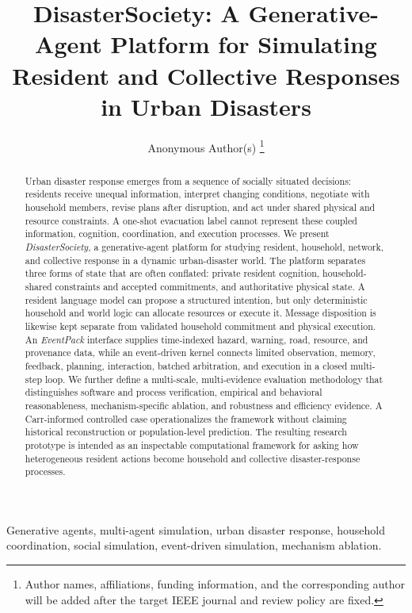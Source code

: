 \documentclass[journal]{IEEEtran}
\title{DisasterSociety: A Generative-Agent Platform for Simulating Resident and Collective Responses in Urban Disasters}
\author{Anonymous Author(s)%
\thanks{Author names, affiliations, funding information, and the corresponding
author will be added after the target IEEE journal and review policy are fixed.}}
\begin{document}
\maketitle


\begin{abstract}
Urban disaster response emerges from a sequence of socially situated decisions:
residents receive unequal information, interpret changing conditions, negotiate
with household members, revise plans after disruption, and act under shared
physical and resource constraints. A one-shot evacuation label cannot represent
these coupled information, cognition, coordination, and execution processes. We
present \emph{DisasterSociety}, a generative-agent platform for studying resident,
household, network, and collective response in a dynamic urban-disaster world.
The platform separates three forms of state that are often conflated: private
resident cognition, household-shared constraints and accepted commitments, and
authoritative physical state. A resident language model can propose a structured
intention, but only deterministic household and world logic can allocate
resources or execute it. Message disposition is likewise kept separate from
validated household commitment and physical execution. An \emph{EventPack}
interface supplies time-indexed hazard, warning, road, resource, and provenance
data, while an event-driven kernel connects limited observation, memory,
feedback, planning, interaction, batched arbitration, and execution in a closed
multi-step loop. We further define a multi-scale, multi-evidence evaluation
methodology that distinguishes software and process verification, empirical and
behavioral reasonableness, mechanism-specific ablation, and robustness and
efficiency evidence. A Carr-informed controlled case operationalizes the
framework without claiming historical reconstruction or population-level
prediction. The resulting research prototype is intended as an inspectable
computational framework for asking how heterogeneous resident actions become
household and collective disaster-response processes.
\end{abstract}

\begin{IEEEkeywords}
Generative agents, multi-agent simulation, urban disaster response, household
coordination, social simulation, event-driven simulation, mechanism ablation.
\end{IEEEkeywords}
\end{document}
